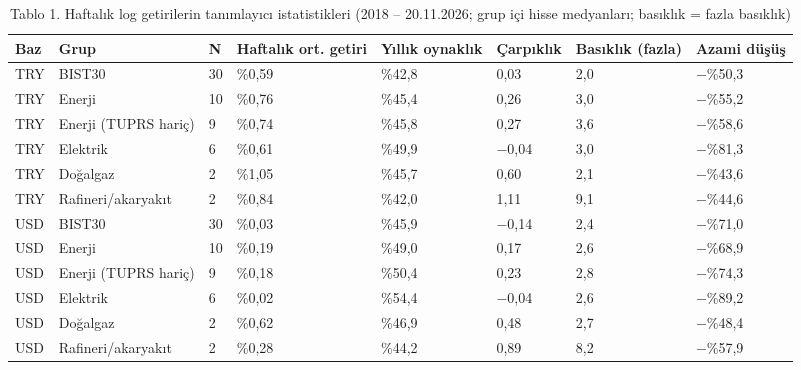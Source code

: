 \begin{table}
\caption{Tablo 1. Haftalık log getirilerin tanımlayıcı istatistikleri (2018 – 20.11.2026; grup içi hisse medyanları; basıklık = fazla basıklık)}
\label{tab:tablo_01_tanimlayici_istatistikler}
\begin{tabular}{llllllll}
\toprule
Baz & Grup & N & Haftalık ort. getiri & Yıllık oynaklık & Çarpıklık & Basıklık (fazla) & Azami düşüş \\
\midrule
TRY & BIST30 & 30 & \%0,59 & \%42,8 & 0,03 & 2,0 & −\%50,3 \\
TRY & Enerji & 10 & \%0,76 & \%45,4 & 0,26 & 3,0 & −\%55,2 \\
TRY & Enerji (TUPRS hariç) & 9 & \%0,74 & \%45,8 & 0,27 & 3,6 & −\%58,6 \\
TRY &   Elektrik & 6 & \%0,61 & \%49,9 & −0,04 & 3,0 & −\%81,3 \\
TRY &   Doğalgaz & 2 & \%1,05 & \%45,7 & 0,60 & 2,1 & −\%43,6 \\
TRY &   Rafineri/akaryakıt & 2 & \%0,84 & \%42,0 & 1,11 & 9,1 & −\%44,6 \\
USD & BIST30 & 30 & \%0,03 & \%45,9 & −0,14 & 2,4 & −\%71,0 \\
USD & Enerji & 10 & \%0,19 & \%49,0 & 0,17 & 2,6 & −\%68,9 \\
USD & Enerji (TUPRS hariç) & 9 & \%0,18 & \%50,4 & 0,23 & 2,8 & −\%74,3 \\
USD &   Elektrik & 6 & \%0,02 & \%54,4 & −0,04 & 2,6 & −\%89,2 \\
USD &   Doğalgaz & 2 & \%0,62 & \%46,9 & 0,48 & 2,7 & −\%48,4 \\
USD &   Rafineri/akaryakıt & 2 & \%0,28 & \%44,2 & 0,89 & 8,2 & −\%57,9 \\
\bottomrule
\end{tabular}
\end{table}
